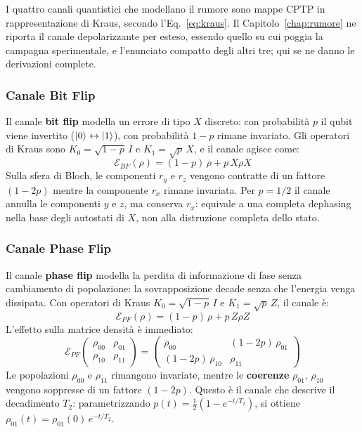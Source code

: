 
I quattro canali quantistici che modellano il rumore sono mappe \ac{CPTP} in rappresentazione di Kraus, secondo l'Eq.~\ref{eq:kraus}. Il Capitolo~\ref{chap:rumore} ne riporta il canale depolarizzante per esteso, essendo quello su cui poggia la campagna sperimentale, e l'enunciato compatto degli altri tre; qui se ne danno le derivazioni complete.

\subsubsection{Canale Bit Flip}

Il canale \textbf{bit flip} modella un errore di tipo $X$ discreto: con probabilità $p$ il qubit viene invertito ($\ket{0}\leftrightarrow\ket{1}$), con probabilità $1-p$ rimane invariato. Gli operatori di Kraus sono $K_0 = \sqrt{1-p}\,I$ e $K_1 = \sqrt{p}\,X$, e il canale agisce come:
\begin{equation}
    \mathcal{E}_{BF}(\rho) = (1-p)\,\rho + p\,X\rho X
    \label{eq:bitflip}
\end{equation}
Sulla sfera di Bloch, le componenti $r_y$ e $r_z$ vengono contratte di un fattore $(1-2p)$ mentre la componente $r_x$ rimane invariata. Per $p=1/2$ il canale annulla le componenti $y$ e $z$, ma conserva $r_x$: equivale a una completa dephasing nella base degli autostati di $X$, non alla distruzione completa dello stato.

\subsubsection{Canale Phase Flip}

Il canale \textbf{phase flip} modella la perdita di informazione di fase senza cambiamento di popolazione: la sovrapposizione decade senza che l'energia venga dissipata. Con operatori di Kraus $K_0 = \sqrt{1-p}\,I$ e $K_1 = \sqrt{p}\,Z$, il canale è:
\begin{equation}
    \mathcal{E}_{PF}(\rho) = (1-p)\,\rho + p\,Z\rho Z
    \label{eq:phaseflip}
\end{equation}
L'effetto sulla matrice densità è immediato:
\begin{equation}
    \mathcal{E}_{PF}\!\begin{pmatrix}\rho_{00} & \rho_{01} \\ \rho_{10} & \rho_{11}\end{pmatrix}
    = \begin{pmatrix}\rho_{00} & (1-2p)\,\rho_{01} \\ (1-2p)\,\rho_{10} & \rho_{11}\end{pmatrix}
\end{equation}
Le popolazioni $\rho_{00}$ e $\rho_{11}$ rimangono invariate, mentre le \textbf{coerenze} $\rho_{01}$, $\rho_{10}$ vengono soppresse di un fattore $(1-2p)$. Questo è il canale che descrive il decadimento $T_2$: parametrizzando $p(t) = \frac{1}{2}(1-e^{-t/T_2})$, si ottiene $\rho_{01}(t) = \rho_{01}(0)\,e^{-t/T_2}$.

